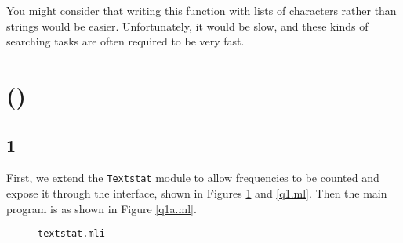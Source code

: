 \documentclass[]{book}
\begin{document}
\noindent You might consider that writing this function with lists of characters rather than strings would be easier. Unfortunately, it would be slow, and these kinds of searching tasks are often required to be very fast.

\section*{ ()}
\subsection*{1}
First, we extend the \texttt{Textstat} module to allow frequencies to be counted and expose it through the interface, shown in Figures \ref{q1.mli} and \ref{q1.ml}. Then the main program is as shown in Figure \ref{q1a.ml}.

\begin{figure}
\begin{center}
\end{center}
\caption{\small\texttt{textstat.mli}}
\label{q1.mli}
\end{figure}
\end{document}
